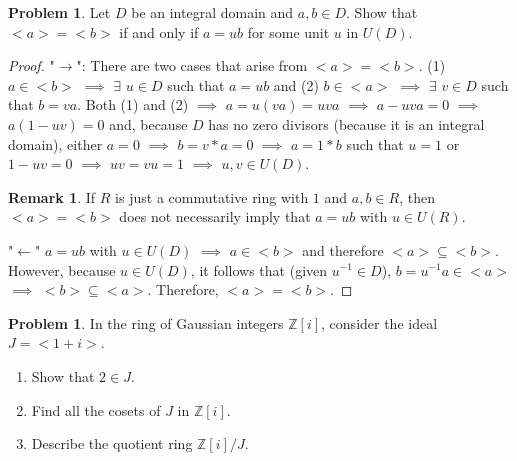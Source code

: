 \documentclass[11pt]{article}
\theoremstyle{definition}
\newtheorem{prob}[thm]{Problem}
\newtheorem{rem}[thm]{Remark}
\numberwithin{equation}{section}
\newcommand{\Z}{\mathbb{Z}}
\begin{document}
\begin{prob}
Let $D$ be an integral domain and $a, b \in D$. Show that $<a> = <b>$ if and only if $a = ub$ for some unit $u$ in $U(D)$.
\end{prob}

\begin{proof}
"$\rightarrow$": There are two cases that arise from $<a> = <b>$. (1) $a \in <b>$ $\implies$ $\exists$ $u \in D$ such that $a = ub$ and (2) $b \in <a>$ $\implies$ $\exists$ $v \in D$ such that $b = va$. Both (1) and (2) $\implies$ $a = u(va) = uva $ $\implies$
$a - uva = 0$ $\implies$ $a(1-uv) = 0$ and, because $D$ has no zero divisors (because it is an integral domain), either $a = 0$ $\implies$ $b = v*a = 0$ $\implies$ $a = 1*b$ such that $u = 1$ or $1-uv = 0$ $\implies$ $uv = vu = 1$ $\implies$ $u, v \in U(D)$.

\begin{rem}
If $R$ is just a commutative ring with $1$ and $a, b \in R$, then $<a> = <b>$ does not necessarily imply that $a = ub$ with $u \in U(R)$.
\end{rem}

"$\leftarrow$" $a = ub$ with $u \in U(D)$ $\implies$ $a \in <b>$ and therefore $<a> \subseteq <b>$. However, because $u \in U(D)$, it follows that (given $u^{-1} \in D$), $b = u^{-1}a \in <a>$ $\implies$ $<b> \subseteq <a>$. Therefore, $<a> = <b>$.
\end{proof}

\begin{prob}
In the ring of Gaussian integers $\Z[i]$, consider the ideal $J = <1+i>$.
\begin{enumerate}
    \item Show that $2 \in J$.
    \item Find all the cosets of $J$ in $\Z[i]$.
    \item Describe the quotient ring $\Z[i]/J$.
\end{enumerate}
\end{prob}
\end{document}
